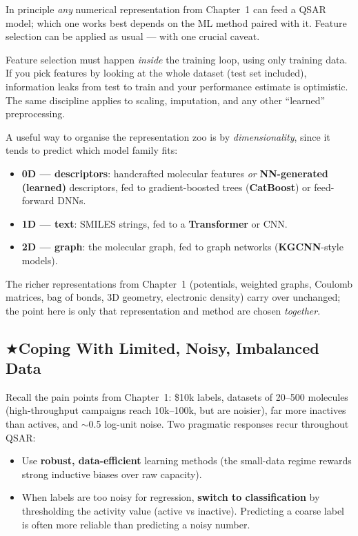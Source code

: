 \documentclass[11pt, oneside]{book}
\makeatletter
\newcommand{\starglyph}{\textcolor{stargold}{\ensuremath{\bigstar}}}
\newcommand{\starsec}[1]{%
  \texorpdfstring{\starglyph\hspace{0.4em}\textcolor{star@frame}{#1}}{#1}}
\makeatother
\begin{document}
In principle \emph{any} numerical representation from Chapter~1 can feed a QSAR
model; which one works best depends on the ML method paired with it. Feature
selection can be applied as usual --- with one crucial caveat.

\begin{notebox}[title={Feature-selection bias}]
Feature selection must happen \emph{inside} the training loop, using only training
data. If you pick features by looking at the whole dataset (test set included),
information leaks from test to train and your performance estimate is optimistic.
The same discipline applies to scaling, imputation, and any other ``learned''
preprocessing.
\end{notebox}

A useful way to organise the representation zoo is by \emph{dimensionality}, since
it tends to predict which model family fits:
\begin{itemize}
  \item \textbf{0D --- descriptors}: handcrafted molecular features \emph{or}
        \textbf{NN-generated (learned)} descriptors, fed to gradient-boosted trees
        (\textbf{CatBoost}) or feed-forward DNNs.
  \item \textbf{1D --- text}: SMILES strings, fed to a \textbf{Transformer} or CNN.
  \item \textbf{2D --- graph}: the molecular graph, fed to graph networks
        (\textbf{KGCNN}-style models).
\end{itemize}
The richer representations from Chapter~1 (potentials, weighted graphs, Coulomb
matrices, bag of bonds, 3D geometry, electronic density) carry over unchanged; the
point here is only that representation and method are chosen \emph{together}.

\subsection{\starsec{Coping With Limited, Noisy, Imbalanced Data}}

Recall the pain points from Chapter~1: \$10k labels, datasets of 20--500
molecules (high-throughput campaigns reach 10k--100k, but are noisier), far more
inactives than actives, and $\sim$0.5 log-unit noise. Two
pragmatic responses recur throughout QSAR:

\begin{itemize}
  \item Use \textbf{robust, data-efficient} learning methods (the small-data
        regime rewards strong inductive biases over raw capacity).
  \item When labels are too noisy for regression, \textbf{switch to
        classification} by thresholding the activity value (active vs inactive).
        Predicting a coarse label is often more reliable than predicting a noisy
        number.
\end{itemize}
\end{document}
